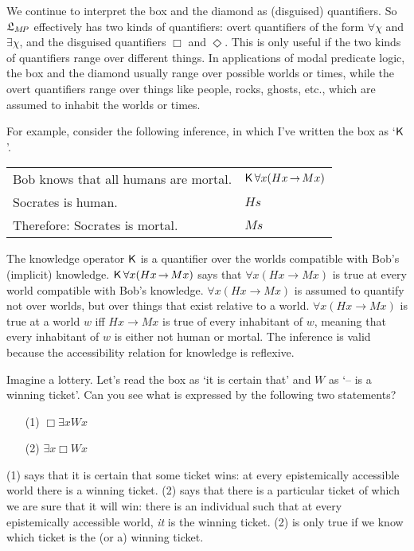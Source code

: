 We continue to interpret the box and the diamond as (disguised) quantifiers. So
$\mathfrak{L}_{M\!P}$ effectively has two kinds of quantifiers: overt quantifiers of the
form $\forall \chi$ and $\exists \chi$, and the disguised quantifiers $\Box$ and
$\Diamond$. This is only useful if the two kinds of quantifiers range over
different things. In applications of modal predicate logic, the box and the
diamond usually range over possible worlds or times, while the overt
quantifiers range over things like people, rocks, ghosts, etc., which are
assumed to inhabit the worlds or times.

For example, consider the following inference, in which I've written the box as `$\operatorname{\mathsf{K}{}}$'.

\bigskip
\begin{tabular}{ll}
  Bob knows that all humans are mortal. & $\Kn\forall x (Hx \to Mx)$\\
  Socrates is human. & $Hs$\\
  Therefore: Socrates is mortal. & $Ms$
\end{tabular}
\bigskip

\noindent%
The knowledge operator $\operatorname{\mathsf{K}{}}$ is a quantifier over the worlds compatible with
Bob's (implicit) knowledge. $\Kn\forall x (Hx \to Mx)$ says that
$\forall x (Hx \to Mx)$ is true at every world compatible with Bob's knowledge.
$\forall x (Hx \to Mx)$ is assumed to quantify not over worlds, but over things
that exist relative to a world. $\forall x (Hx \to Mx)$ is true at a world $w$
iff $Hx \to Mx$ is true of every inhabitant of $w$, meaning that every
inhabitant of $w$ is either not human or mortal. The inference is valid because
the accessibility relation for knowledge is reflexive.

Imagine a lottery. Let's read the box as `it is certain that' and $W$ as `-- is
a winning ticket'. Can you see what is expressed by the following two
statements?
\begin{enumerate}[leftmargin=14mm]
  \itemsep-1mm
  \item[(1)] $\Box \exists x Wx$
  \item[(2)] $\exists x \Box Wx$
\end{enumerate}
%
(1) says that it is certain that some ticket wins: at every epistemically
accessible world there is a winning ticket. (2) says that there is a particular
ticket of which we are sure that it will win: there is an individual such that
at every epistemically accessible world, \emph{it} is the winning ticket.
(2) is only true if we know which ticket is the (or a) winning ticket.

